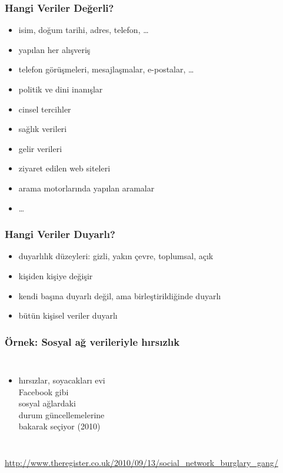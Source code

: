 \documentclass[dvipsnames]{beamer}
\theoremstyle{plain}
\begin{document}
\begin{frame}
  \frametitle{Hangi Veriler Değerli?}

  \begin{itemize}
    \item isim, doğum tarihi, adres, telefon, \ldots
    \item yapılan her alışveriş
    \item telefon görüşmeleri, mesajlaşmalar, e-postalar, \ldots
    \item politik ve dini inanışlar
    \item cinsel tercihler
    \item sağlık verileri
    \item gelir verileri
    \item ziyaret edilen web siteleri
    \item arama motorlarında yapılan aramalar
    \item \ldots
  \end{itemize}
\end{frame}

\begin{frame}
  \frametitle{Hangi Veriler Duyarlı?}

  \begin{itemize}
    \item duyarlılık düzeyleri: gizli, yakın çevre, toplumsal, açık
    \item kişiden kişiye değişir
    \item kendi başına duyarlı değil, ama birleştirildiğinde duyarlı

    \bigskip
    \item bütün kişisel veriler duyarlı
  \end{itemize}
\end{frame}

\begin{frame}
  \frametitle{Örnek: Sosyal ağ verileriyle hırsızlık}

  \begin{columns}

    \begin{itemize}
      \item hırsızlar, soyacakları evi\\
        Facebook gibi\\
        sosyal ağlardaki\\
        durum güncellemelerine\\
        bakarak seçiyor (2010)
    \end{itemize}
  \end{columns}

  \medskip
  \tiny{\url{http://www.theregister.co.uk/2010/09/13/social_network_burglary_gang/}}\\
\end{frame}
\end{document}

